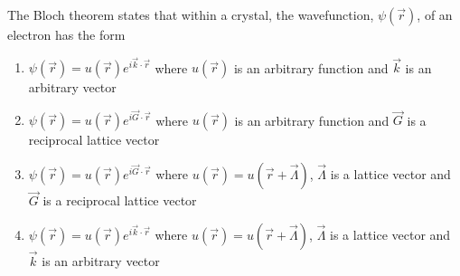 \documentclass{exam}
\begin{document}
\begin{questions}
\question The Bloch theorem states that within a crystal, the wavefunction, $\psi(\vec{r})$, of an electron has the form\hfill{}

\begin{enumerate}
	\item $\psi(\vec{r})=u(\vec{r})e^{i\vec{k}\cdot\vec{r}}$ where $u(\vec{r})$ is an arbitrary function and $\vec{k}$ is an arbitrary vector
	\item $\psi(\vec{r})=u(\vec{r})e^{i\vec{G}\cdot\vec{r}}$ where $u(\vec{r})$ is an arbitrary function and $\vec{G}$ is a reciprocal lattice vector
	\item $\psi(\vec{r})=u(\vec{r})e^{i\vec{G}\cdot\vec{r}}$ where $u(\vec{r})=u(\vec{r}+\vec{\Lambda})$, $\vec{\Lambda}$ is a lattice vector and $\vec{G}$ is a reciprocal lattice vector
	\item $\psi(\vec{r})=u(\vec{r})e^{i\vec{k}\cdot\vec{r}}$ where $u(\vec{r})=u(\vec{r}+\vec{\Lambda})$, $\vec{\Lambda}$ is a lattice vector and $\vec{k}$ is an arbitrary vector
\end{enumerate}


\end{questions}
\end{document}
